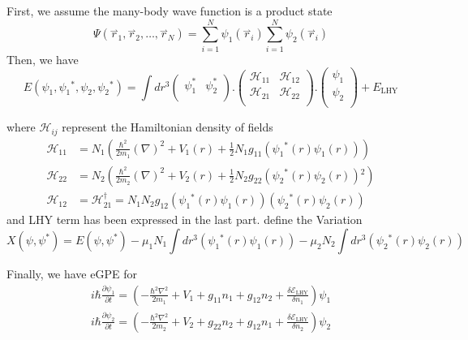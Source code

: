 First, we assume the many-body wave function is a product state
\begin{equation}
\Psi \left(\overset{\rightharpoonup }{r}_1,\overset{\rightharpoonup }{r}_2,\ldots  ,\overset{\rightharpoonup }{r}_N\right)=\sum _{i=1}^N \psi _1\left(\overset{\rightharpoonup
}{r}_i\right)\sum _{i=1}^N \psi _2\left(\overset{\rightharpoonup }{r}_i\right)
\end{equation}
Then, we have
\begin{equation}
E\left(\psi _1,\psi _1{}^*,\psi _2,\psi _2{}^*\right)=\int dr^3\left(
\begin{array}{cc}
 \psi _1^* & \psi _2^* \\
\end{array}
\right).\left(
\begin{array}{cc}
 \mathcal{H}_{11} & \mathcal{H}_{12} \\
 \mathcal{H}_{21} & \mathcal{H}_{22} \\
\end{array}
\right).\left(
\begin{array}{c}
 \psi _1 \\
 \psi _2 \\
\end{array}
\right)+E_{\text{LHY}}
\end{equation}

where $\mathcal{H}_{ij}$ represent the Hamiltonian density of fields
\begin{equation}
\begin{split}
\mathcal{H}_{11}&=N_1\left(\frac{\hbar ^2}{2m_1}(\nabla )^2+V_1(r)+\frac{1}{2}N_1g_{11}\left(\psi _1{}^*(r)\psi _1(r)\right)\right)\\
\mathcal{H}_{22}&=N_2\left(\frac{\hbar ^2}{2m_2}(\nabla )^2+V_2(r)+\frac{1}{2}N_2g_{22}\left(\psi _2{}^*(r)\psi _2(r)\right){}^2\right)\\
\mathcal{H}_{12}&=\mathcal{H}_{21}^{\dagger }=N_1N_2g_{12}\left(\psi _1{}^*(r)\psi _1(r)\right)\left(\psi _2{}^*(r)\psi _2(r)\right)
\end{split}
\end{equation}
and LHY term has been expressed in the last part.
define the Variation
\begin{equation}
X\left(\psi ,\psi ^*\right)=E\left(\psi ,\psi ^*\right)-\mu _1 N_1\int dr^3\left(\psi _1{}^*(r)\psi _1(r)\right)-\mu _2 N_2\int dr^3\left(\psi
_2{}^*(r)\psi _2(r)\right)
\end{equation}

Finally, we have eGPE for 
\begin{equation}
\begin{split}
i \hbar \frac{\partial\psi_1}{\partial t}=\left(-\frac{\hbar^2\nabla^2}{2m_1}+V_1+g_{11}n_1+g_{12}n_2+\frac{\delta  \mathcal{E}_{\text{LHY}}}{\delta n_1}\right)\psi _1\\
i \hbar \frac{\partial \psi _2}{\partial t}=\left(-\frac{\hbar ^2\nabla ^2}{2m_2}+V_2+g_{22}n_2+g_{12}n_1+\frac{\delta  \mathcal{E}_{\text{LHY}}}{\delta n_2}\right)\psi _2
\end{split}
\end{equation}

